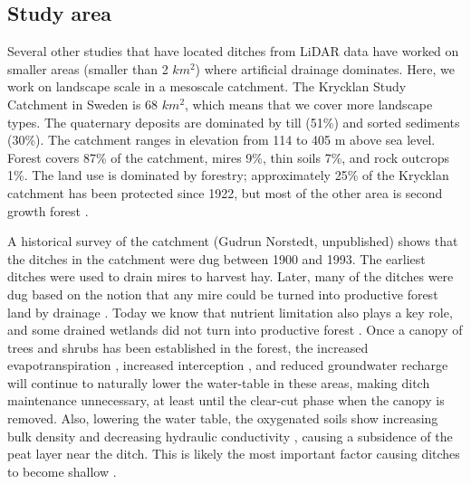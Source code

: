 \documentclass[]{interact}
\theoremstyle{plain}%
\theoremstyle{definition}
\theoremstyle{remark}
\begin{document}
\subsection{Study area}
Several other studies \citep{roelens, bailly, rapinel, kiss} that have located ditches from LiDAR data have worked on smaller areas (smaller than 2 $km^2$) where artificial drainage dominates. Here, we work on landscape scale in a mesoscale catchment. The  Krycklan Study Catchment in Sweden is 68 $km^2$, which means that we cover more landscape types. The quaternary deposits are dominated by till (51\%) and sorted sediments (30\%). The catchment ranges in elevation from 114 to 405 m above sea level. Forest covers 87\% of the catchment, mires 9\%, thin soils 7\%, and rock outcrops 1\%. The land use is dominated by forestry; approximately 25\% of the Krycklan catchment has been protected since 1922, but most of the other area is second growth forest \citep{krycklancatchment}. 

A historical survey of the catchment (Gudrun Norstedt, unpublished) shows that the ditches in the catchment were dug between 1900 and 1993. The earliest ditches were used to drain mires to harvest hay. Later, many of the ditches were dug based on the notion that any mire could be turned into productive forest land by drainage \citep{paivanen}. Today we know that nutrient limitation also plays a key role, and some drained wetlands did not turn into productive forest \citep{sikstrom}. Once a canopy of trees and shrubs has been established in the forest, the increased evapotranspiration \citep{price, koivusalo}, increased interception \citep{price}, and reduced groundwater recharge will continue to naturally lower the water-table in these areas, making ditch maintenance unnecessary, at least until the clear-cut phase when the canopy is removed. Also,  lowering the water table, the oxygenated soils show increasing bulk density and decreasing hydraulic conductivity \citep{silins, price}, causing a subsidence of the peat layer near the ditch. This is likely the most important factor causing ditches to become shallow \citep{heikurainen}.
\end{document}
